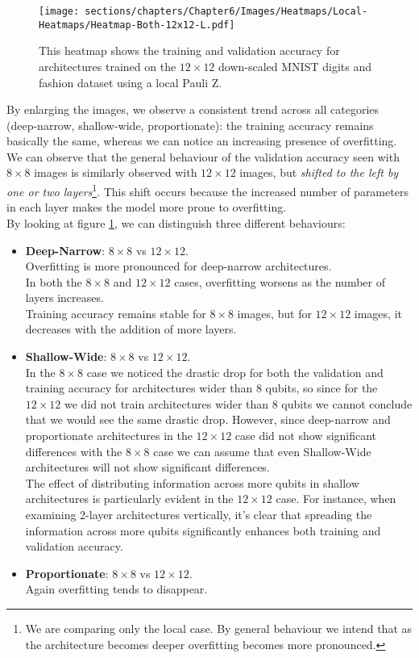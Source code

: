 \begin{figure}[h]
    \centering
    \texttt{[image: sections/chapters/Chapter6/Images/Heatmaps/Local-Heatmaps/Heatmap-Both-12x12-L.pdf]}
    \caption{This heatmap shows the training and validation accuracy for architectures 
    trained on the $12\times12$ down-scaled MNIST digits and fashion dataset using a local Pauli Z.}
    \label{fig:heatmap-12x12-L}
\end{figure}

By enlarging the images, we observe a consistent trend across all categories 
(deep-narrow, shallow-wide, proportionate): the training accuracy remains basically the same, whereas we 
can notice an increasing presence of overfitting.
We can observe that the general behaviour of the validation accuracy seen with $8\times8$ images is 
similarly observed with $12\times12$ images, but \textit{shifted to the left by one or two layers}\footnote[1]{We are comparing only the local case. 
By general behaviour we intend that as the architecture becomes deeper overfitting becomes more 
pronounced.}. This shift 
occurs because the increased number of parameters in each layer makes the model more prone to overfitting.\\

By looking at figure \ref{fig:heatmap-12x12-L}, we can distinguish 
three different behaviours:

\begin{itemize}
    \item \textbf{Deep-Narrow}: $8\times8$ vs $12\times12$.\\
    Overfitting is more pronounced for deep-narrow architectures.\\
    In both the $8\times8$ and $12\times12$ cases, overfitting worsens as the number of layers increases. \\
    Training accuracy remains stable for $8\times8$ images, but for $12\times12$ images, 
    it decreases with the addition of more layers.
    \item \textbf{Shallow-Wide}: $8\times8$ vs $12\times12$.\\
    In the $8\times8$ case we noticed the drastic drop for both the validation and training accuracy for 
    architectures wider than 8 qubits, so since for the $12\times12$ we did not train architectures wider than 
    8 qubits we cannot conclude that we would see the same drastic drop.
    However, since deep-narrow and proportionate architectures in the $12\times12$ case did not show 
    significant differences with the $8\times8$ case we can assume that even Shallow-Wide architectures will
    not show significant differences.\\
    The effect of distributing information across more qubits in shallow architectures is particularly 
    evident in the $12\times12$ case. For instance, when examining 2-layer architectures vertically, 
    it's clear that spreading the information across more qubits significantly enhances both training and 
    validation accuracy.
    \item \textbf{Proportionate}: $8\times8$ vs $12\times12$.\\
    Again overfitting tends to disappear. \\
 \end{itemize}